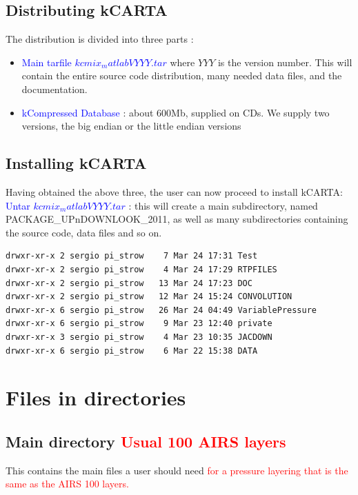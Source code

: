 \documentclass[12pt]{article}
\newcommand{\kc}{\textsf{kCARTA}\xspace}
\begin{document}
\subsection{Distributing \kc}
The distribution is divided into three parts :

\begin{itemize}
\item \textcolor{blue} {Main tarfile $kcmix_matlabVYYY.tar$} where $YYY$ is 
the version number. This will contain the entire source code distribution, 
many needed data files, and the documentation. \\
\item \textcolor{blue} {kCompressed Database} : about 600Mb, supplied on CDs. 
We supply two versions, the big endian or the little endian versions \\
\end{itemize}

\subsection{Installing \kc}
Having obtained the above three, the user can now proceed to install \kc : 
\textcolor{blue} {Untar $kcmix_matlabVYYY.tar$} :  this will create a 
main subdirectory, named PACKAGE\_UPnDOWNLOOK\_2011, as well as many 
subdirectories containing the source code, data files and so on.

\begin{verbatim}
drwxr-xr-x 2 sergio pi_strow    7 Mar 24 17:31 Test
drwxr-xr-x 2 sergio pi_strow    4 Mar 24 17:29 RTPFILES
drwxr-xr-x 2 sergio pi_strow   13 Mar 24 17:23 DOC
drwxr-xr-x 2 sergio pi_strow   12 Mar 24 15:24 CONVOLUTION
drwxr-xr-x 6 sergio pi_strow   26 Mar 24 04:49 VariablePressure
drwxr-xr-x 6 sergio pi_strow    9 Mar 23 12:40 private
drwxr-xr-x 3 sergio pi_strow    4 Mar 23 10:35 JACDOWN
drwxr-xr-x 6 sergio pi_strow    6 Mar 22 15:38 DATA
\end{verbatim}

\section{Files in directories}

\subsection{Main directory \textcolor{red}{Usual 100 AIRS layers}}
This contains the main files a user should need \textcolor{red}{for a 
pressure layering that is the same as the AIRS 100 layers.} 
\end{document}
